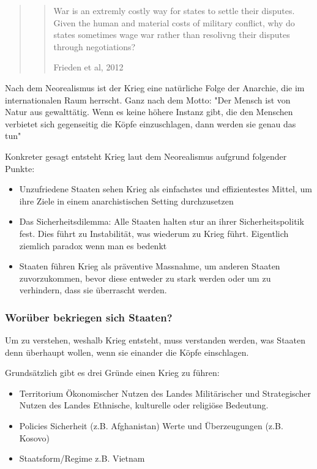 \documentclass[a4paper, 11pt]{article}
\begin{document}
\begin{quote}
    \centering
    \blockquote[Frieden et al, 2012]{War is an extremly costly way for states to settle their disputes. Given the human and material costs of military conflict, why do states sometimes wage war rather than resolivng their disputes through negotiations?}
\end{quote}

Nach dem Neorealismus ist der Krieg eine natürliche Folge der Anarchie, die im internationalen Raum herrscht. Ganz nach dem Motto: "Der Mensch ist von Natur aus gewalttätig. Wenn es keine höhere Instanz gibt, die den Menschen verbietet sich gegenseitig die Köpfe einzuschlagen, dann werden sie genau das tun"

Konkreter gesagt entsteht Krieg laut dem Neorealismus aufgrund folgender Punkte:

\begin{itemize}
	\item Unzufriedene Staaten sehen Krieg als einfachstes und effizientestes Mittel, um ihre Ziele in einem anarchistischen Setting durchzusetzen
	\item Das Sicherheitsdilemma: Alle Staaten halten stur an ihrer Sicherheitspolitik fest. Dies führt zu Instabilität, was wiederum zu Krieg führt. Eigentlich ziemlich paradox wenn man es bedenkt
	\item Staaten führen Krieg als präventive Massnahme, um anderen Staaten zuvorzukommen, bevor diese entweder zu stark werden oder um zu verhindern, dass sie überrascht werden.
\end{itemize}


 \subsubsection{Worüber bekriegen sich Staaten?}
 Um zu verstehen, weshalb Krieg entsteht, muss verstanden werden, was Staaten denn überhaupt wollen, wenn sie einander die Köpfe einschlagen.

 Grundsätzlich gibt es drei Gründe einen Krieg zu führen:

 \begin{itemize}
     \item Territorium
        \subitem Ökonomischer Nutzen des Landes
        \subitem Militärischer und Strategischer Nutzen des Landes
        \subitem Ethnische, kulturelle oder religiöse Bedeutung.
    \item Policies
        \subitem Sicherheit (z.B. Afghanistan)
        \subitem Werte und Überzeugungen (z.B. Kosovo)
    \item Staatsform/Regime
        \subitem z.B. Vietnam
\end{itemize}
\end{document}

